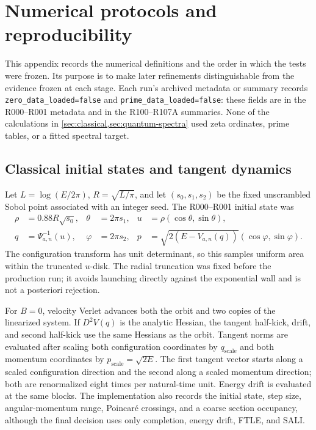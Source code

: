 \section{Numerical protocols and reproducibility}
\label{app:numerics}

This appendix records the numerical definitions and the order in which the
tests were frozen.  Its purpose is to make later refinements distinguishable
from the evidence frozen at each stage.  Each run's archived metadata or
summary records \texttt{zero\_data\_loaded=false} and
\texttt{prime\_data\_loaded=false}: these fields are in the R000--R001
metadata and in the R100--R107A summaries.  None of the calculations in
\cref{sec:classical,sec:quantum-spectra} used zeta ordinates, prime
tables, or a fitted spectral target.

\subsection{Classical initial states and tangent dynamics}

Let \(L=\log(E/2\pi)\), \(R=\sqrt{L/\pi}\), and let
\((s_0,s_1,s_2)\) be the fixed unscrambled Sobol point associated with an
integer seed.  The R000--R001 initial state was
\begin{align}
 \rho&=0.88R\sqrt{s_0},
 &\theta&=2\pi s_1,
 &u&=\rho(\cos\theta,\sin\theta),\\
 q&=\Psi_{a,n}^{-1}(u),
 &\varphi&=2\pi s_2,
 &p&=\sqrt{2(E-V_{a,n}(q))}(\cos\varphi,\sin\varphi).
 \label{eq:classical-seed-map}
\end{align}
The configuration transform has unit determinant, so this samples uniform
area within the truncated \(u\)-disk.  The radial truncation was fixed before
the production run; it avoids launching directly against the exponential
wall and is not a posteriori rejection.

For \(B=0\), velocity Verlet advances both the orbit and two copies of the
linearized system.  If \(D^2V(q)\) is the analytic Hessian, the tangent
half-kick, drift, and second half-kick use the same Hessians as the orbit.
Tangent norms are evaluated after scaling both configuration coordinates by
\(q_{\mathrm{scale}}\) and both momentum coordinates by
\(p_{\mathrm{scale}}=\sqrt{2E}\).  The first tangent vector starts along a
scaled configuration direction and the second along a scaled momentum
direction; both are renormalized eight times per natural-time unit.  Energy
drift is evaluated at the same blocks.  The implementation also records the
initial state, step size, angular-momentum range, Poincar\'e crossings, and a
coarse section occupancy, although the final decision uses only completion,
energy drift, FTLE, and SALI.

